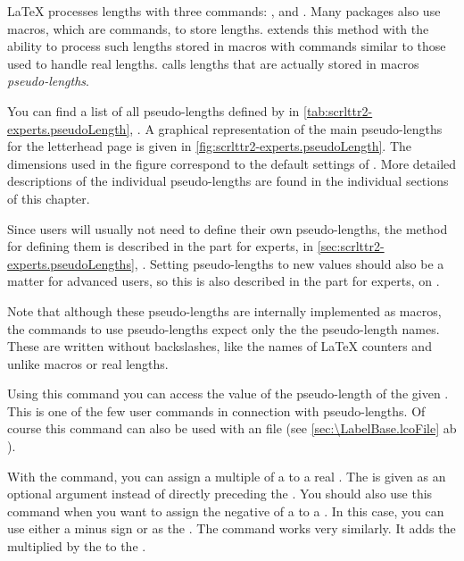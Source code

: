 \LaTeX{} processes lengths with three commands:
, 
and . Many packages also use macros,
which are commands, to store lengths. \KOMAScript{} extends this method with
the ability to process such lengths stored in macros with commands similar to
those used to handle real lengths. \KOMAScript{} calls lengths that are
actually stored in macros \emph{pseudo-lengths}.

You can find a list of all pseudo-lengths defined by  in
\autoref{tab:scrlttr2-experts.pseudoLength},
. A graphical representation of
the main pseudo-lengths for the letterhead page is given in
\autoref{fig:scrlttr2-experts.pseudoLength}. The dimensions used in the figure
correspond to the default settings of . More detailed
descriptions of the individual pseudo-lengths are found in the individual
sections of this chapter.

Since users will usually not need to define their own pseudo-lengths, the
method for defining them is described in the part for experts, in
\autoref{sec:scrlttr2-experts.pseudoLengths},
. Setting pseudo-lengths to new
values should also be a matter for advanced users, so this is also described
in the part for experts, on .

Note that although these pseudo-lengths are internally
implemented as macros, the commands to use pseudo-lengths expect only the the
pseudo-length names. These are written without backslashes, like the names of
\LaTeX{} counters and unlike macros or real lengths.

\begin{Declaration}
\end{Declaration}
Using this command you can access the value of the pseudo-length of
the given . This is one of the few user commands in
connection with pseudo-lengths. Of course this command can also be
used with an  file (see
\autoref{sec:\LabelBase.lcoFile} ab ).%
%
\EndIndexGroup


\begin{Declaration}
\end{Declaration}
With the  command, you can assign a multiple of a
 to a real .  The  is given
as an optional argument instead of directly preceding the
. You should also use this command when you want to
assign the negative of a  to a . In this
case, you can use either a minus sign or  as the .
The  command works very similarly. It adds the
 multiplied by the  to the .%
%
\EndIndexGroup
%
\EndIndexGroup

